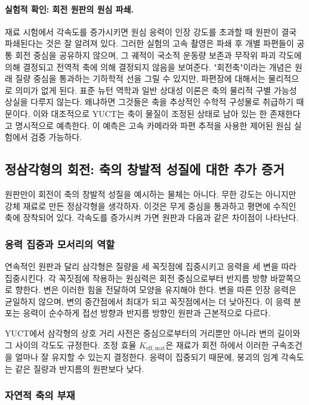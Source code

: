 \documentclass[12pt,a4paper]{article}
\begin{document}
	\paragraph{실험적 확인: 회전 원판의 원심 파쇄.}
	재료 시험에서 각속도를 증가시키면 원심 응력이 인장 강도를 초과할 때 원판이 결국 파쇄된다는 것은 잘 알려져 있다. 그러한 실험의 고속 촬영은 파쇄 후 개별 파편들이 공통 회전 중심을 공유하지 않으며, 그 궤적이 국소적 운동량 보존과 무작위 파괴 각도에 의해 결정되고 전역적 축에 의해 결정되지 않음을 보여준다. "회전축"이라는 개념은 원래 질량 중심을 통과하는 기하학적 선을 그릴 수 있지만, 파편장에 대해서는 물리적으로 의미가 없게 된다. 표준 뉴턴 역학과 일반 상대성 이론은 축의 물리적 구별 가능성 상실을 다루지 않는다. 왜냐하면 그것들은 축을 추상적인 수학적 구성물로 취급하기 때문이다. 이와 대조적으로 YUCT는 축이 물질이 조정된 상태로 남아 있는 한 존재한다고 명시적으로 예측한다. 이 예측은 고속 카메라와 파편 추적을 사용한 제어된 원심 실험에서 검증 가능하다.
	
	\subsection{정삼각형의 회전: 축의 창발적 성질에 대한 추가 증거}
	
	원판만이 회전이 축의 창발적 성질을 예시하는 물체는 아니다. 무한 강도는 아니지만 강체 재료로 만든 정삼각형을 생각하자. 이것은 무게 중심을 통과하고 평면에 수직인 축에 장착되어 있다. 각속도를 증가시켜 가면 원판과 다음과 같은 차이점이 나타난다.
	
	\subsubsection{응력 집중과 모서리의 역할}
	
	연속적인 원판과 달리 삼각형은 질량을 세 꼭짓점에 집중시키고 응력을 세 변을 따라 집중시킨다. 각 꼭짓점에 작용하는 원심력은 회전 중심으로부터 반지름 방향 바깥쪽으로 향한다. 변은 이러한 힘을 전달하여 모양을 유지해야 한다. 변을 따른 인장 응력은 균일하지 않으며, 변의 중간점에서 최대가 되고 꼭짓점에서는 더 낮아진다. 이 응력 분포는 응력이 순수하게 접선 방향과 반지름 방향인 원판과 근본적으로 다르다.
	
	YUCT에서 삼각형의 상호 거리 사전은 중심으로부터의 거리뿐만 아니라 변의 길이와 그 사이의 각도도 규정한다. 조정 효율 \(K_{\mathrm{eff,mat}}\)은 재료가 회전 하에서 이러한 구속조건을 얼마나 잘 유지할 수 있는지 결정한다. 응력이 집중되기 때문에, 붕괴의 임계 각속도는 같은 질량과 반지름의 원판보다 낮다.
	
	\subsubsection{자연적 축의 부재}
	
\end{document}
